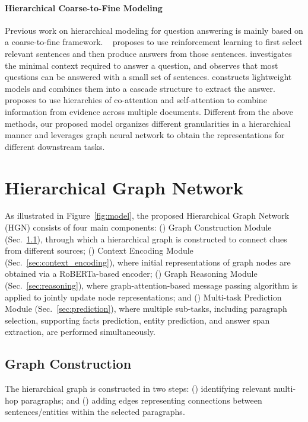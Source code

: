 \documentclass[11pt,a4paper]{article}
\begin{document}
\paragraph{Hierarchical Coarse-to-Fine Modeling}
Previous work on hierarchical modeling for question answering is mainly based on a coarse-to-fine framework.
~\citet{choi-etal-2017-coarse} proposes to use reinforcement learning to first select relevant sentences and then produce answers from those sentences.
\citet{min-etal-2018-efficient} investigates the minimal context required to answer a question, and observes that most questions can be answered with a small set of sentences.
\citet{swayamdipta2018multimention} constructs lightweight models and combines them into a cascade structure to extract the answer.
\citet{zhong2018coarsegrain} proposes to use hierarchies of co-attention and self-attention to combine information from evidence across multiple documents. 
Different from the above methods, our proposed model organizes different granularities in a hierarchical manner and leverages graph neural network to obtain the representations for different downstream tasks.

\section{Hierarchical Graph Network}

As illustrated in Figure~\ref{fig:model}, the proposed Hierarchical Graph Network (HGN) consists of four main components: () Graph Construction Module (Sec.~\ref{sec:buildGraph}), through which a hierarchical graph is constructed to connect clues from different sources; () Context Encoding Module (Sec.~\ref{sec:context_encoding}), where initial representations of graph nodes are obtained via a RoBERTa-based encoder; () Graph Reasoning Module (Sec.~\ref{sec:reasoning}), where  graph-attention-based message passing algorithm is applied to jointly update node representations; and () Multi-task Prediction Module (Sec.~\ref{sec:prediction}), where multiple sub-tasks, including paragraph selection, supporting facts prediction, entity prediction, and answer span extraction, are performed simultaneously.

\subsection{Graph Construction}
\label{sec:buildGraph}
The hierarchical graph is constructed in two steps: () identifying relevant multi-hop paragraphs; and () adding edges representing connections between sentences/entities within the selected paragraphs.
\end{document}
